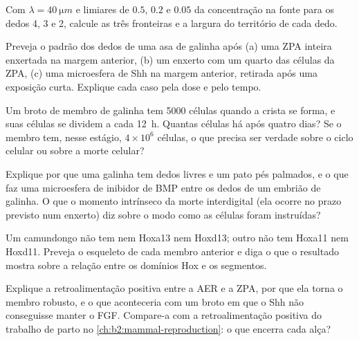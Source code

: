 \begin{exercise}[$\star\star$]\label{exo:b2:limb-organogenesis:5}
Com $\lambda = \qty{40}{\micro m}$ e limiares de $0.5$, $0.2$
e $0.05$ da concentração na fonte para os dedos 4, 3 e 2, calcule as
três fronteiras e a largura do território de cada dedo.
\end{exercise}

\begin{exercise}[$\star\star$]\label{exo:b2:limb-organogenesis:6}
Preveja o padrão dos dedos de uma asa de galinha após (a) uma ZPA
inteira enxertada na margem anterior, (b) um enxerto com um quarto das
células da ZPA, (c) uma microesfera de Shh na margem anterior, retirada
após uma exposição curta. Explique cada caso pela dose e pelo tempo.
\end{exercise}

\begin{exercise}[$\star\star$]\label{exo:b2:limb-organogenesis:7}
Um broto de membro de galinha tem \num{5000} células quando a crista se
forma, e suas células se dividem a cada \qty{12}{h}. Quantas células
há após quatro dias? Se o membro tem, nesse estágio, $4\times 10^{6}$
células, o que precisa ser verdade sobre o ciclo celular ou sobre a
morte celular?
\end{exercise}

\begin{exercise}[$\star\star$]\label{exo:b2:limb-organogenesis:8}
Explique por que uma galinha tem dedos livres e um pato pés palmados, e
o que faz uma microesfera de inibidor de BMP entre os dedos de um
embrião de galinha. O que o momento intrínseco da morte interdigital
(ela ocorre no prazo previsto num enxerto) diz sobre o modo como as
células foram instruídas?
\end{exercise}

\begin{exercise}[$\star\star$]\label{exo:b2:limb-organogenesis:9}
Um camundongo não tem nem Hoxa13 nem Hoxd13; outro não tem Hoxa11 nem
Hoxd11. Preveja o esqueleto de cada membro anterior e diga o que o
resultado mostra sobre a relação entre os domínios Hox e os segmentos.
\end{exercise}

\begin{exercise}[$\star\star\star$]\label{exo:b2:limb-organogenesis:10}
Explique a retroalimentação positiva entre a AER e a ZPA, por que ela
torna o membro robusto, e o que aconteceria com um broto em que o Shh
não conseguisse manter o FGF. Compare-a com a retroalimentação positiva
do trabalho de parto no \cref{ch:b2:mammal-reproduction}: o que encerra cada alça?
\end{exercise}

